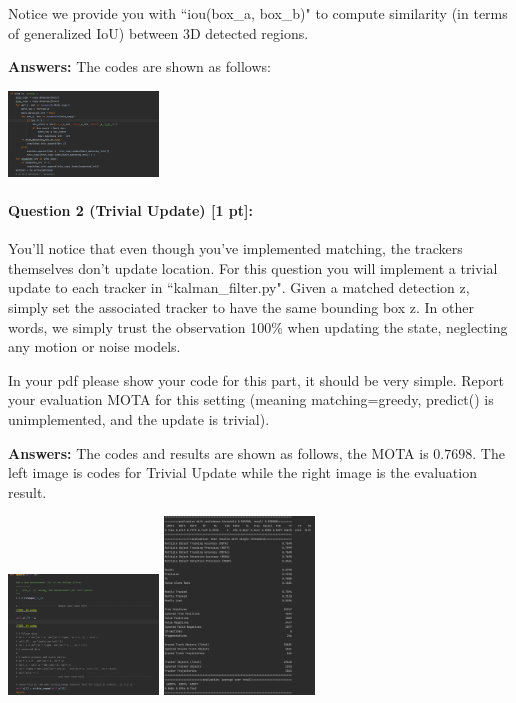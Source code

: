 \documentclass[11pt]{article}
\begin{document}
Notice we provide you with ``iou(box\_a, box\_b)" to compute similarity (in terms of generalized IoU) between 3D detected regions.

\textbf{Answers:} The codes are shown as follows:

\begin{center}
    \includegraphics[width=0.3\textwidth]{./fig/Q1.png}
\end{center}

\paragraph{Question 2 (Trivial Update) [1 pt]:}
You'll notice that even though you've implemented matching, the trackers themselves don't update location. For this question you will implement a trivial update to each tracker in ``kalman\_filter.py". Given a matched detection z, simply set the associated tracker to have the same bounding box z. In other words, we simply trust the observation 100\% when updating the state, neglecting any motion or noise models.

In your pdf please show your code for this part, it should be very simple. Report your evaluation MOTA for this setting (meaning matching=greedy, predict() is unimplemented, and the update is trivial).

\textbf{Answers:} The codes and results are shown as follows, the MOTA is $0.7698$. The left image is codes for Trivial Update while the right image is the evaluation result.
\begin{center}
    \includegraphics[width=0.3\textwidth]{./fig/Q2_code.png}
    \includegraphics[width=0.3\textwidth]{./fig/Q2_result_all.png}
\end{center}
\end{document}
